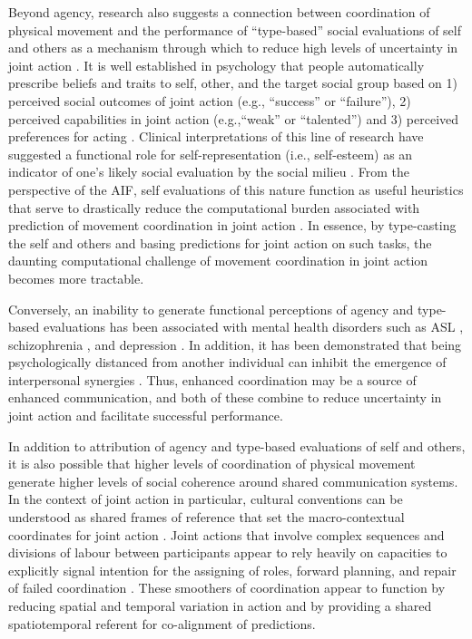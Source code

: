 \begin{CJK}{UTF8}{gbsn}
Beyond agency, research also suggests a connection between coordination of physical movement and the performance of ``type-based'' social evaluations of self and others as a mechanism through which to reduce high levels of uncertainty in joint action \citep{Moutoussis2011,Moutoussis2014}.  It is well established in psychology that people automatically prescribe beliefs and traits to self, other, and the target social group based on 1) perceived social outcomes of joint action (e.g., ``success'' or ``failure''), 2) perceived capabilities in joint action (e.g.,``weak'' or ``talented'') and 3) perceived preferences for acting \citep[e.g., ``good,'' ``fair,'' or ``trustworthy'';][]{Bem1967,Fowler2006}.  Clinical interpretations of this line of research have suggested a functional role for self-representation (i.e., self-esteem) as an indicator of one's likely social evaluation by the social milieu \citep{Leary1995}. From the perspective of the AIF, self evaluations of this nature function as useful heuristics that serve to drastically reduce the computational burden associated with prediction of movement coordination in joint action \citep{Moutoussis2011}. In essence, by type-casting the self and others and basing predictions for joint action on such tasks, the daunting computational challenge of movement coordination in joint action becomes more tractable.

Conversely, an inability to generate functional perceptions of agency and type-based evaluations has been associated with mental health disorders such as ASL \citep{Friston2015}, schizophrenia \citep{Frith2007}, and depression \citep{Moutoussis2011}.  In addition, it has been demonstrated that being psychologically distanced from another individual can inhibit the emergence of interpersonal synergies \citep{Miles2010}.  Thus, enhanced coordination may be a source of enhanced communication, and both of these combine to reduce uncertainty in joint action and facilitate successful performance.

In addition to attribution of agency and type-based evaluations of self and others, it is also possible that higher levels of coordination of physical movement generate higher levels of social coherence around shared communication systems.  In the context of joint action in particular, cultural conventions can be understood as shared frames of reference that set the macro-contextual coordinates for joint action \citep{Clark2013}.  Joint actions that involve complex sequences and divisions of labour between participants appear to rely heavily on capacities to explicitly signal intention for the assigning of roles, forward planning, and repair of failed coordination \citep{Frith2010}. These smoothers of coordination appear to function by reducing spatial and temporal variation in action and by providing a shared spatiotemporal referent for co-alignment of predictions.


\end{CJK}
